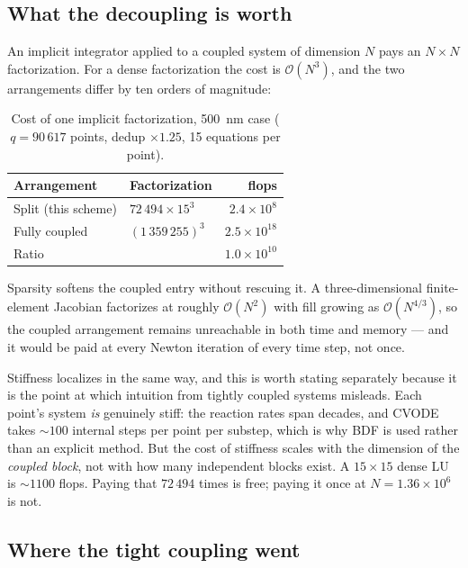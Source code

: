 \documentclass[11pt,a4paper]{article}
\begin{document}
\subsection{What the decoupling is worth}

An implicit integrator applied to a coupled system of dimension $N$ pays an
$N \times N$ factorization. For a dense factorization the cost is
$\mathcal{O}(N^3)$, and the two arrangements differ by ten orders of magnitude:

\begin{table}[htb]
\centering
\caption{Cost of one implicit factorization, 500~nm case
($q = 90\,617$ points, dedup $\times 1.25$, 15 equations per point).}
\label{tab:tractability}
\begin{tabular}{llr}
\toprule
Arrangement & Factorization & flops \\
\midrule
Split (this scheme)   & $72\,494 \times 15^3$      & $2.4\times10^{8}$ \\
Fully coupled         & $(1\,359\,255)^3$          & $2.5\times10^{18}$ \\
\midrule
\multicolumn{2}{l}{Ratio}                          & $1.0\times10^{10}$ \\
\bottomrule
\end{tabular}
\end{table}

Sparsity softens the coupled entry without rescuing it. A three-dimensional
finite-element Jacobian factorizes at roughly $\mathcal{O}(N^2)$ with fill
growing as $\mathcal{O}(N^{4/3})$, so the coupled arrangement remains
unreachable in both time and memory --- and it would be paid at every Newton
iteration of every time step, not once.

Stiffness localizes in the same way, and this is worth stating separately
because it is the point at which intuition from tightly coupled systems
misleads. Each point's system \emph{is} genuinely stiff: the reaction rates
span decades, and CVODE takes $\sim\!100$ internal steps per point per substep,
which is why BDF is used rather than an explicit method. But the cost of
stiffness scales with the dimension of the \emph{coupled block}, not with how
many independent blocks exist. A $15 \times 15$ dense LU is $\sim\!1100$ flops.
Paying that $72\,494$ times is free; paying it once at $N = 1.36\times10^{6}$ is
not.

\subsection{Where the tight coupling went}
\end{document}
